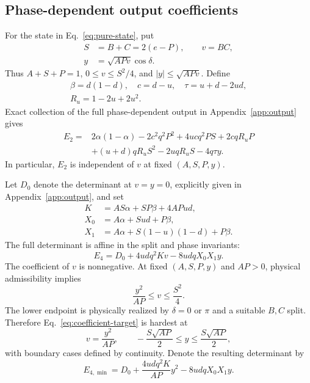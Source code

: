 \documentclass[pra,aps,twocolumn,nofootinbib,superscriptaddress]{revtex4-2}
\begin{document}
\subsection{Phase-dependent output coefficients}

For the state in Eq.~\eqref{eq:pure-state}, put
\begin{align}
S&=B+C=2(e-P),\qquad v=BC,\nonumber\\
y&=\sqrt{APv}\cos\delta.
\label{eq:state-invariants}
\end{align}
Thus $A+S+P=1$, $0\leq v\leq S^2/4$, and
$|y|\leq\sqrt{APv}$.  Define
\begin{gather}
\beta=d(1-d),\quad c=d-u,\quad \tau=u+d-2ud,\nonumber\\
R_u=1-2u+2u^2.
\end{gather}
Exact collection of the full phase-dependent output in
Appendix~\ref{app:output} gives
\begin{align}
E_2={}&2\alpha(1-\alpha)-2c^2q^2P^2+4ucq^2PS
+2cqR_uP\nonumber\\
&+(u+d)qR_uS^2-2uqR_uS-4q\tau y.
\label{eq:E2}
\end{align}
In particular, $E_2$ is independent of $v$ at fixed $(A,S,P,y)$.

Let $D_0$ denote the determinant at $v=y=0$, explicitly given in
Appendix~\ref{app:output}, and set
\begin{align}
K&=AS\alpha+SP\beta+4APud,\nonumber\\
X_0&=A\alpha+Sud+P\beta,\nonumber\\
X_1&=A\alpha+S(1-u)(1-d)+P\beta.
\label{eq:KX}
\end{align}
The full determinant is affine in the split and phase invariants:
\begin{equation}
E_4=D_0+4udq^2K v-8udqX_0X_1y.
\label{eq:E4}
\end{equation}
The coefficient of $v$ is nonnegative.  At fixed $(A,S,P,y)$ and $AP>0$,
physical admissibility implies
\begin{equation}
\frac{y^2}{AP}\leq v\leq\frac{S^2}{4}.
\end{equation}
The lower endpoint is physically realized by $\delta=0$ or $\pi$ and a
suitable $B,C$ split.  Therefore Eq.~\eqref{eq:coefficient-target} is hardest
at
\begin{equation}
v=\frac{y^2}{AP},\qquad
-\frac{S\sqrt{AP}}{2}\leq y\leq\frac{S\sqrt{AP}}{2},
\label{eq:worst-split}
\end{equation}
with boundary cases defined by continuity.  Denote the resulting determinant
by
\begin{equation}
E_{4,\min}=D_0+\frac{4udq^2K}{AP}y^2-8udqX_0X_1y.
\label{eq:E4min}
\end{equation}
\end{document}
